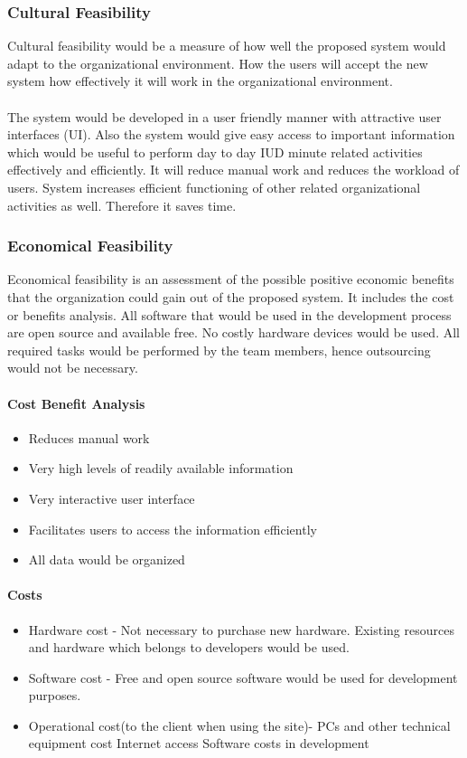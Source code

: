 \documentclass[a4paper,beamer]{article}
\begin{document}
	\subsubsection{Cultural Feasibility}
	Cultural feasibility would be a measure of how well the proposed system would adapt to the organizational environment. How the users will accept the new system how effectively it will work in the organizational environment.\\\\
	The system would be developed in a user friendly manner with attractive user interfaces (UI). Also the system would give easy access to important information which would be useful to perform day to day IUD minute related activities effectively and efficiently.
	It will reduce manual work and reduces the workload of users.
	System increases efficient functioning of other related organizational activities as well. Therefore it saves time.
	
	\subsubsection{Economical Feasibility}
	Economical feasibility is an assessment of the possible positive economic benefits that the organization could gain out of the proposed system. It includes the cost or benefits analysis. All software that would be used in the development process are open source and available free. No costly hardware devices would be used. All required tasks would be performed by the team members, hence outsourcing would not be necessary.
	
	\paragraph{\textbf{Cost Benefit Analysis}}
	\begin{itemize}
		\item Reduces manual work
		\item Very high levels of readily available information
		\item Very interactive user interface
		\item Facilitates users to access the information efficiently
		\item All data would be organized
	\end{itemize}
	
	\paragraph{\textbf{Costs}}
	\begin{itemize}
		\item Hardware cost -
		Not necessary to purchase new hardware. Existing resources and hardware which belongs to developers would be used.
		\item Software cost - 
		Free and open source software would be used for development purposes.
		\item Operational cost(to the client when using the site)-
		PCs and other technical equipment cost
		Internet access
		Software costs in development
	\end{itemize}
	
\end{document}
